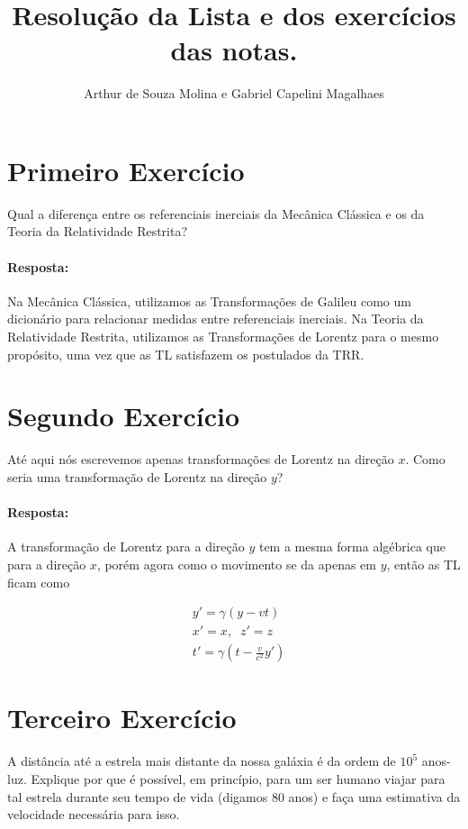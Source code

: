 \documentclass[10pt,a4paper]{article}
\author{Arthur de Souza Molina e Gabriel Capelini Magalhaes}
\title{Resolução da Lista e dos exercícios das notas.}
\begin{document}
	\maketitle
	\section{Primeiro Exercício}
	Qual a diferença entre os referenciais inerciais da Mecânica Clássica e os da Teoria da Relatividade Restrita?
	
	\paragraph{Resposta:}
	Na Mecânica Clássica, utilizamos as Transformações de Galileu como um dicionário para relacionar medidas entre referenciais inerciais. Na Teoria da Relatividade Restrita, utilizamos as Transformações de Lorentz para o mesmo propósito, uma vez que as TL satisfazem os postulados da TRR.
	
	
	\section{Segundo Exercício}
	Até aqui nós escrevemos apenas transformações de Lorentz na direção \(x\).
	Como seria uma transformação de Lorentz na direção \(y\)?	
	\paragraph{Resposta:}
	A transformação de Lorentz para a direção \(y\) tem a mesma forma algébrica que para a direção \(x\), porém agora como o movimento se da apenas em \(y\), então as TL ficam como
	
	\begin{equation}
		\begin{split}
			& y' = \gamma(y-vt) \\
			& x'=x, \;\; z'=z \\
			& t' = \gamma\left(t-\frac{v}{c^2}y'\right)
		\end{split}
	\end{equation}
	
	\section{Terceiro Exercício}
	A distância até a estrela mais distante da nossa galáxia é da ordem de $10^{5}$ anos-luz. Explique por que é possível, em princípio, para um ser humano viajar para tal estrela durante seu tempo de vida (digamos 80 anos) e faça uma estimativa da velocidade necessária para isso.
\end{document}

